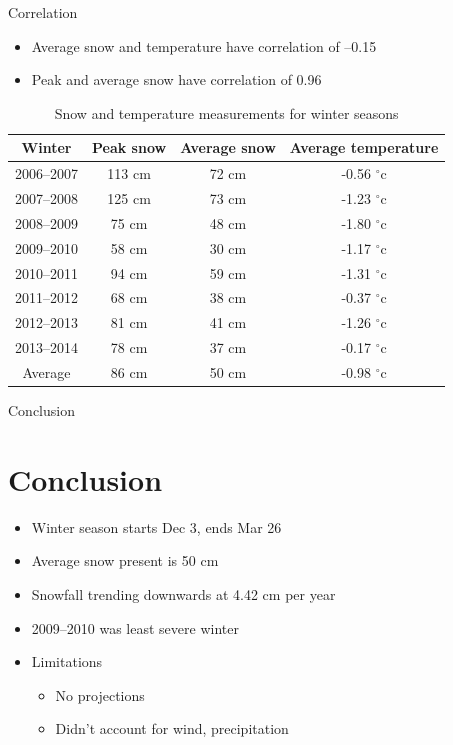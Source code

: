 \documentclass{beamer}
\begin{document}
\begin{frame}{Correlation}

\begin{itemize}
\item Average snow and temperature have correlation of --0.15
\item Peak and average snow have correlation of 0.96
\end{itemize}

\begin{table}[ht]
\begin{tabular}{c c c c}
\hline
Winter & Peak snow & Average snow & Average temperature \\ \hline
2006--2007 & 113 cm & 72 cm & -0.56 $^{\circ}$c \\
2007--2008 & 125 cm & 73 cm & -1.23 $^{\circ}$c \\
2008--2009 & 75 cm & 48 cm & -1.80 $^{\circ}$c \\
2009--2010 & 58 cm & 30 cm & -1.17 $^{\circ}$c \\
2010--2011 & 94 cm & 59 cm & -1.31 $^{\circ}$c \\
2011--2012 & 68 cm & 38 cm & -0.37 $^{\circ}$c \\
2012--2013 & 81 cm & 41 cm & -1.26 $^{\circ}$c \\
2013--2014 & 78 cm & 37 cm & -0.17 $^{\circ}$c \\ \hline
Average & 86 cm & 50 cm & -0.98 $^{\circ}$c \\ \hline
\end{tabular}
\caption{Snow and temperature measurements for winter seasons}
\end{table}

\end{frame}

\begin{frame}{Conclusion}

\section{Conclusion}

\begin{itemize}
\item Winter season starts Dec 3, ends Mar 26
\item Average snow present is 50 cm 
\item Snowfall trending downwards at 4.42 cm per year
\item 2009--2010 was least severe winter 
\item Limitations
\begin{itemize}
\item No projections 
\item Didn't account for wind, precipitation
\end{itemize}
\end{itemize}

\end{frame}
\end{document}
